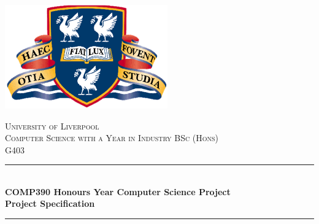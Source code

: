 \documentclass[12pt,a4paper,oneside]{report}
\begin{document}

\begin{titlepage}

\newcommand{\HRule}{\rule{\linewidth}{0.5mm}} %

\center %
 

\includegraphics[width=7cm]{images/uol.png}


\textsc{\LARGE University of Liverpool}\\[1.5cm] %
\textsc{\large Computer Science with a Year in Industry BSc (Hons)}\\[0.5cm] %
\textsc{\large G403}\\[0.5cm] %


\HRule \\[0.4cm]
{ \huge \bfseries COMP390 Honours Year Computer Science Project \\[0.5cm]
Project Specification}\\
[0.4cm] %
\HRule \\[1.5cm]
 


\end{titlepage}
\end{document}
